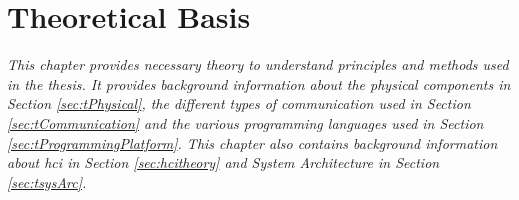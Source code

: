\chapter{Theoretical Basis}
\textit{This chapter provides necessary theory to understand principles and methods used in the thesis. It provides background information about the physical components in Section \ref{sec:tPhysical}, the different types of communication used in Section \ref{sec:tCommunication} and the various programming languages used in Section \ref{sec:tProgrammingPlatform}. This chapter also contains background information about \acrfull{hci} in Section \ref{sec:hcitheory} and System Architecture in Section \ref{sec:tsysArc}.}




